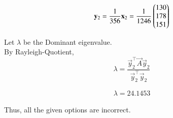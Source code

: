 \documentclass[journal]{IEEEtran}
\begin{document}
\begin{equation}
    \mathbf{y}_2 = \frac{1}{356} \mathbf{x}_2 = \frac{1}{1246}\begin{pmatrix}130 \\ 178 \\ 151\end{pmatrix}
\end{equation}

\newpage

Let $\lambda$ be the Dominant eigenvalue.\\

By Rayleigh-Quotient,
\begin{equation}
    \lambda = \dfrac{\vec{y}_2^\top\vec{A}\vec{y}_2}{\vec{y}_2^\top\vec{y}_2}
\end{equation}

\begin{align*}
    \boxed{\lambda = 24.1453}
\end{align*}

Thus, all the given options are incorrect.
\end{document}
